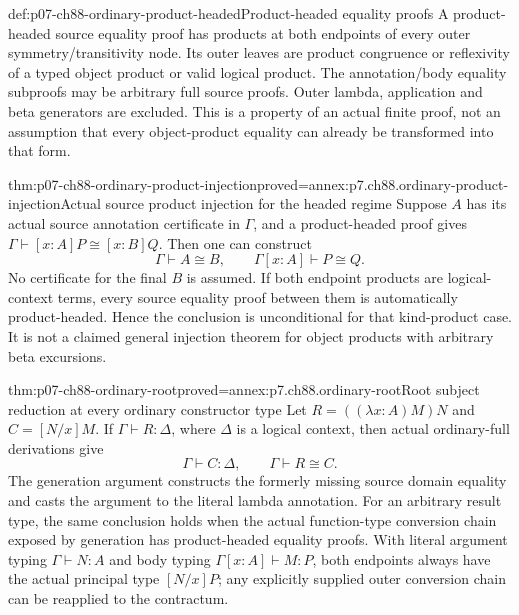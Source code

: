 \begin{hbdefinition}{def:p07-ch88-ordinary-product-headed}{Product-headed equality proofs}
A product-headed source equality proof has products at both endpoints
of every outer symmetry/transitivity node. Its outer leaves are product
congruence or reflexivity of a typed object product or valid logical
product. The annotation/body equality subproofs may be arbitrary full
source proofs. Outer lambda, application and beta generators are excluded.
This is a property of an actual finite proof, not an assumption that
every object-product equality can already be transformed into that form.
\end{hbdefinition}

\begin{hbtheorem}{thm:p07-ch88-ordinary-product-injection}{proved=annex:p7.ch88.ordinary-product-injection}{Actual source product injection for the headed regime}
Suppose \(A\) has its actual source annotation certificate in
\(\Gamma\), and a product-headed proof gives
\(\Gamma\vdash[x:A]P\cong[x:B]Q\). Then one can construct
\[
 \Gamma\vdash A\cong B,\qquad
 \Gamma[x:A]\vdash P\cong Q.
\]
No certificate for the final \(B\) is assumed. If both endpoint
products are logical-context terms, every source equality proof between
them is automatically product-headed. Hence the conclusion is
unconditional for that kind-product case. It is not a claimed general
injection theorem for object products with arbitrary beta excursions.
\end{hbtheorem}

\begin{hbtheorem}{thm:p07-ch88-ordinary-root}{proved=annex:p7.ch88.ordinary-root}{Root subject reduction at every ordinary constructor type}
Let \(R=((\lambda x:A)M)N\) and \(C=[N/x]M\).
If \(\Gamma\vdash R:\Delta\), where \(\Delta\) is a logical
context, then actual ordinary-full derivations give
\[
 \Gamma\vdash C:\Delta,\qquad\Gamma\vdash R\cong C.
\]
The generation argument constructs the formerly missing source domain
equality and casts the argument to the literal lambda annotation.
For an arbitrary result type, the same conclusion holds when the actual
function-type conversion chain exposed by generation has product-headed
equality proofs. With literal argument typing \(\Gamma\vdash N:A\)
and body typing \(\Gamma[x:A]\vdash M:P\), both endpoints always
have the actual principal type \([N/x]P\); any explicitly supplied
outer conversion chain can be reapplied to the contractum.
\end{hbtheorem}

